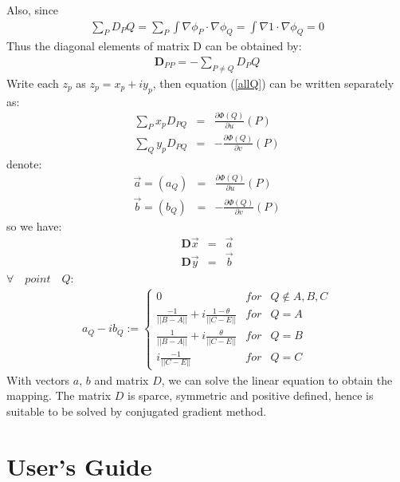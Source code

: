 \documentclass{InsightArticle}
\begin{document}
  Also, since
   \begin{eqnarray}  
      \sum_P D_PQ = \sum_P \int \nabla \phi_P \cdot \nabla \phi_Q = \int \nabla 1 \cdot \nabla \phi_Q = 0
  \end{eqnarray}
  Thus the diagonal elements of matrix D can be obtained by:
    \begin{eqnarray}
      \mathbf{D}_{PP} = -\sum_{P \ne Q}D_PQ \label{diagonalOfD}
    \end{eqnarray}    
    Write each $z_p$ as $z_p=x_p + iy_p$, then
    equation (\ref{allQ}) can be written separately as:
    \begin{eqnarray}
      \sum_{P}x_p D_{PQ} &=& \frac{\partial \Phi(Q)}{\partial u}(P) \nonumber\\
      \sum_{Q}y_p D_{PQ} &=& -\frac{\partial \Phi(Q)}{\partial v} (P)
    \end{eqnarray}  
    denote:
    \begin{eqnarray}
      \vec{a} = (a_Q) &=& \frac{\partial \Phi(Q)}{\partial u}(P) \nonumber \\
      \vec{b} = (b_Q) &=& -\frac{\partial \Phi(Q)}{\partial v} (P)
    \end{eqnarray}  
    so we have:
    \begin{eqnarray}
      \mathbf{D}\vec{x} &=& \vec{a} \nonumber \\
      \mathbf{D}\vec{y} &=& \vec{b} \label{z}
    \end{eqnarray}    
    $\forall \quad point \quad Q$:
    \begin{eqnarray}
      a_Q - ib_Q := \left\{
      \begin{array}{lcl}
        0 & for & Q \notin {A, B, C} \\
        \frac{-1}{||B-A||} + i\frac{1-\theta}{||C-E||} & for & Q = A \\
        \frac{1}{||B-A||} + i\frac{\theta}{||C-E||} & for & Q = B \\
        i\frac{-1}{||C-E||} & for & Q = C
      \end{array} \right. \label{ab}
    \end{eqnarray}      
With vectors $a$, $b$ and matrix $D$, we can solve the linear equation to obtain the mapping.
The matrix $D$ is sparce, symmetric and positive defined, hence is suitable to be solved by conjugated gradient method.

\section{User's Guide}
\end{document}
